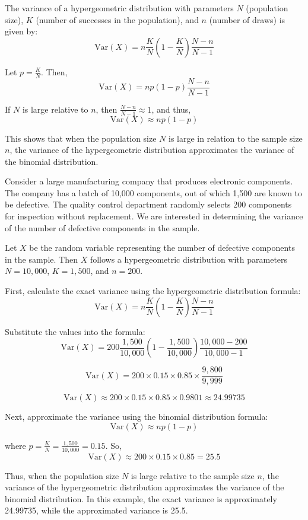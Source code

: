 The variance of a hypergeometric distribution with parameters \(N\) (population size), \(K\) (number of successes in the population), and \(n\) (number of draws) is given by:
\[
\text{Var}(X) = n \frac{K}{N} \left(1 - \frac{K}{N}\right) \frac{N - n}{N - 1}
\]

Let \(p = \frac{K}{N}\). Then,
\[
\text{Var}(X) = np(1 - p) \frac{N - n}{N - 1}
\]

If \(N\) is large relative to \(n\), then \(\frac{N - n}{N - 1} \approx 1\), and thus,
\[
\text{Var}(X) \approx np(1 - p)
\]

This shows that when the population size \(N\) is large in relation to the sample size \(n\), the variance of the hypergeometric distribution approximates the variance of the binomial distribution.

\begin{example}
Consider a large manufacturing company that produces electronic components. The company has a batch of 10,000 components, out of which 1,500 are known to be defective. The quality control department randomly selects 200 components for inspection without replacement. We are interested in determining the variance of the number of defective components in the sample.

Let \(X\) be the random variable representing the number of defective components in the sample. Then \(X\) follows a hypergeometric distribution with parameters \(N = 10,000\), \(K = 1,500\), and \(n = 200\).

First, calculate the exact variance using the hypergeometric distribution formula:
\[
\text{Var}(X) = n \frac{K}{N} \left(1 - \frac{K}{N}\right) \frac{N - n}{N - 1}
\]

Substitute the values into the formula:
\[
\text{Var}(X) = 200 \frac{1,500}{10,000} \left(1 - \frac{1,500}{10,000}\right) \frac{10,000 - 200}{10,000 - 1}
\]

\[
\text{Var}(X) = 200 \times 0.15 \times 0.85 \times \frac{9,800}{9,999}
\]

\[
\text{Var}(X) \approx 200 \times 0.15 \times 0.85 \times 0.9801 \approx 24.99735
\]

Next, approximate the variance using the binomial distribution formula:
\[
\text{Var}(X) \approx np(1 - p)
\]

where \(p = \frac{K}{N} = \frac{1,500}{10,000} = 0.15\). So,
\[
\text{Var}(X) \approx 200 \times 0.15 \times 0.85 = 25.5
\]

Thus, when the population size \(N\) is large relative to the sample size \(n\), the variance of the hypergeometric distribution approximates the variance of the binomial distribution. In this example, the exact variance is approximately 24.99735, while the approximated variance is 25.5.

\end{example}

